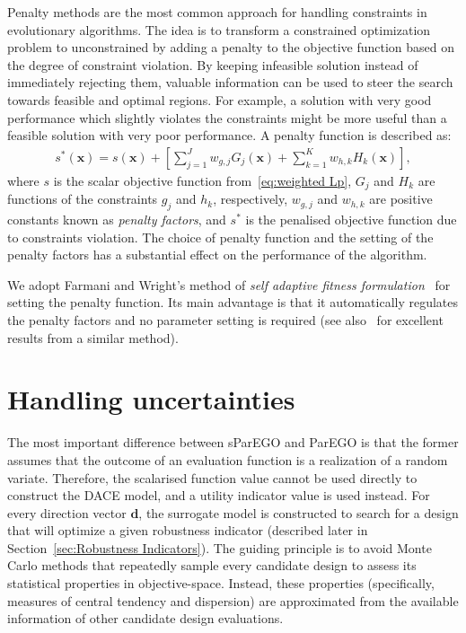 \documentclass[a4paper]{article}
\newcommand{\brs}[1]{\left[{#1}\right]} %
\newcommand{\brr}[1]{{\left({#1}\right)}} %
\newcommand{\vx}{\ensuremath{\mathbf{x}}} %
\newcommand{\vd}{\ensuremath{\mathbf{d}}} %
\begin{document}
Penalty methods are the most common approach for handling constraints in evolutionary algorithms. The idea is to transform a constrained optimization problem to unconstrained by adding a penalty to the objective function based on the degree of constraint violation. By keeping infeasible solution instead of immediately rejecting them, valuable information can be used to steer the search towards feasible and optimal regions. For example, a solution with very good performance which slightly violates the constraints might be more useful than a feasible solution with very poor performance. A penalty function is described as:
\begin{align}
s^*\brr{\vx} = s\brr{\vx} + \brs{\sum_{j=1}^J w_{g,j}G_j\brr{\vx} + \sum_{k=1}^K w_{h,k}H_k\brr{\vx} }, 
\end{align}
where $s$ is the scalar objective function from~\eqref{eq:weighted Lp}, $G_j$ and $H_k$ are functions of the constraints $g_j$ and $h_k$, respectively, $w_{g,j}$ and $w_{h,k}$ are positive constants known as \emph{penalty factors}, and $s^*$ is the penalised objective function due to constraints violation. The choice of penalty function and the setting of the penalty factors has a substantial effect on the performance of the algorithm.

We adopt Farmani and Wright's method of \emph{self adaptive fitness formulation}~\cite{Farmani2003Self} for setting the penalty function. Its main advantage is that it automatically regulates the penalty factors and no parameter setting is required (see also~\cite{eiben1998adaptive} for excellent results from a similar method).

\section{Handling uncertainties}
\label{sec:Uncertainty Approximation}
The most important difference between sParEGO and ParEGO is that the former assumes that the outcome of an evaluation function is a realization of a random variate. Therefore, the scalarised function value cannot be used directly to construct the DACE model, and a utility indicator value is used instead. For every direction vector $\vd$, the surrogate model is constructed to search for a design that will optimize a given robustness indicator (described later in Section~\ref{sec:Robustness Indicators}). The guiding principle is to avoid Monte Carlo methods that repeatedly sample every candidate design to assess its statistical properties in objective-space. Instead, these properties (specifically, measures of central tendency and dispersion) are approximated from the available information of other candidate design evaluations.
\end{document}
